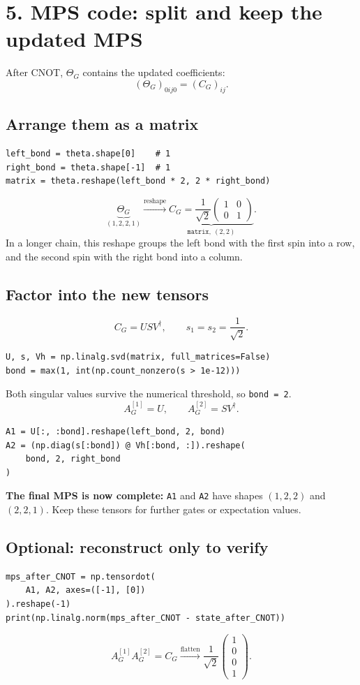 \documentclass[11pt]{article}
\newcommand{\vfour}[4]{\begin{pmatrix}#1\\#2\\#3\\#4\end{pmatrix}}
\newcommand{\mtwo}[4]{\begin{pmatrix}#1&#2\\#3&#4\end{pmatrix}}
\begin{document}
\newpage
\section*{5. MPS code: split and keep the updated MPS}
\setlength{\parskip}{3pt}
\setlength{\abovedisplayskip}{7pt}
\setlength{\belowdisplayskip}{7pt}
After CNOT, $\Theta_G$ contains the updated coefficients:
\[
(\Theta_G)_{0ij0}=(C_G)_{ij}.
\]
\subsection*{Arrange them as a matrix}
\begin{lstlisting}
left_bond = theta.shape[0]    # 1
right_bond = theta.shape[-1]  # 1
matrix = theta.reshape(left_bond * 2, 2 * right_bond)
\end{lstlisting}
\[
\underbrace{\Theta_G}_{(1,2,2,1)}
\xrightarrow{\text{reshape}}
\underbrace{C_G=\frac1{\sqrt2}\mtwo{1}{0}{0}{1}}_{\texttt{matrix},\ (2,2)}.
\]
In a longer chain, this reshape groups the left bond with the first spin into a row, and the second spin with the right bond into a column.

\subsection*{Factor into the new tensors}
\[
C_G=USV^\dagger,\qquad s_1=s_2=\frac1{\sqrt2}.
\]
\begin{lstlisting}
U, s, Vh = np.linalg.svd(matrix, full_matrices=False)
bond = max(1, int(np.count_nonzero(s > 1e-12)))
\end{lstlisting}
Both singular values survive the numerical threshold, so \texttt{bond = 2}.
\[
A_G^{[1]}=U,\qquad A_G^{[2]}=SV^\dagger.
\]
\begin{lstlisting}
A1 = U[:, :bond].reshape(left_bond, 2, bond)
A2 = (np.diag(s[:bond]) @ Vh[:bond, :]).reshape(
    bond, 2, right_bond
)
\end{lstlisting}
\textbf{The final MPS is now complete:} \texttt{A1} and \texttt{A2} have shapes $(1,2,2)$ and $(2,2,1)$. Keep these tensors for further gates or expectation values.

\subsection*{Optional: reconstruct only to verify}
\begin{lstlisting}
mps_after_CNOT = np.tensordot(
    A1, A2, axes=([-1], [0])
).reshape(-1)
print(np.linalg.norm(mps_after_CNOT - state_after_CNOT))
\end{lstlisting}
\[
A_G^{[1]}A_G^{[2]}=C_G
\xrightarrow{\text{flatten}}
\frac1{\sqrt2}\vfour{1}{0}{0}{1}.
\]
\end{document}
